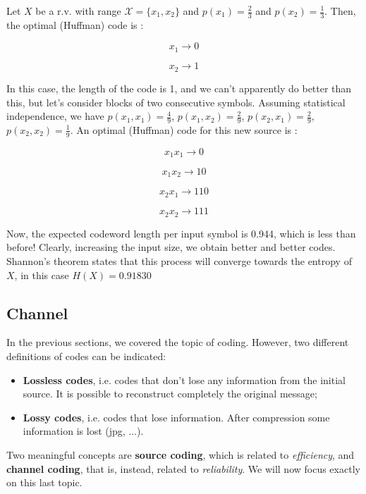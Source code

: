 \begin{exmp}
    Let $X$ be a r.v. with range $\mathcal{X} = \{ x_1, x_2 \}$ and $p(x_1) = \frac{2}{3}$ and $p(x_2) = \frac{1}{3}$. Then, the optimal (Huffman) code is :

    $$
    x_1 \xrightarrow{} 0
    $$

    $$
    x_2 \xrightarrow{} 1
    $$

    In this case, the length of the code is 1, and we can't apparently do better than this, but let's consider blocks of two consecutive symbols. Assuming statistical independence, we have $p(x_1, x_1) = \frac{4}{9}$, $p(x_1, x_2) = \frac{2}{9}$, $p(x_2, x_1) = \frac{2}{9}$, $p(x_2, x_2) = \frac{1}{9}$. An optimal (Huffman) code for this new source is :

    $$
    x_1 x_1 \xrightarrow{} 0
    $$

    $$
    x_1 x_2 \xrightarrow{} 10
    $$

    $$
    x_2 x_1 \xrightarrow{} 110
    $$

    $$
    x_2 x_2 \xrightarrow{} 111
    $$

    Now, the expected codeword length per input symbol is 0.944, which is less than before! Clearly, increasing the input size, we obtain better and better codes. Shannon's theorem states that this process will converge towards the entropy of $X$, in this case $H(X) = 0.91830$
    
\end{exmp}

\subsection{Channel}
In the previous sections, we covered the topic of coding. However, two different definitions of codes can be indicated:
\begin{itemize}
	\item \textbf{Lossless codes}, i.e. codes that don't lose any information from the initial source. It is possible to reconstruct completely the original message;
	\item \textbf{Lossy codes}, i.e. codes that lose information. After compression some information is lost (jpg, $\dots$).
\end{itemize}
Two meaningful concepts are \textbf{source coding}, which is related to \textit{efficiency}, and \textbf{channel coding}, that is, instead, related to \textit{reliability}. We will now focus exactly on this last topic. 

